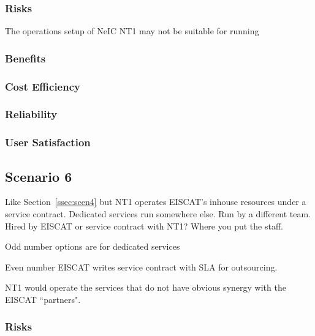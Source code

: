 \documentclass[12pt,a4paper]{article}
\begin{document}
\subsubsection*{Risks}
\bitm
\item The operations setup of NeIC NT1 may not be suitable for running
\eitm

\subsubsection*{Benefits}
\bitm
\item 
\eitm

\subsubsection*{Cost Efficiency}
\bitm
\item 
\eitm

\subsubsection*{Reliability}
\bitm
\item 
\eitm

\subsubsection*{User Satisfaction}
\bitm
\item 
\eitm

\subsection{Scenario 6}
\label{ssec:scen6}

Like Section~\ref{ssec:scen4} but NT1 operates EISCAT's inhouse resources under a service contract.
Dedicated services run somewhere else.
Run by a different team.
Hired by EISCAT or service contract with NT1?
Where you put the staff.

Odd number options are for dedicated services

Even number EISCAT writes service contract with SLA for outsourcing.

NT1 would operate the services that do not have obvious synergy with the EISCAT ``partners".

\subsubsection*{Risks}
\bitm
\item 
\eitm
\end{document}

